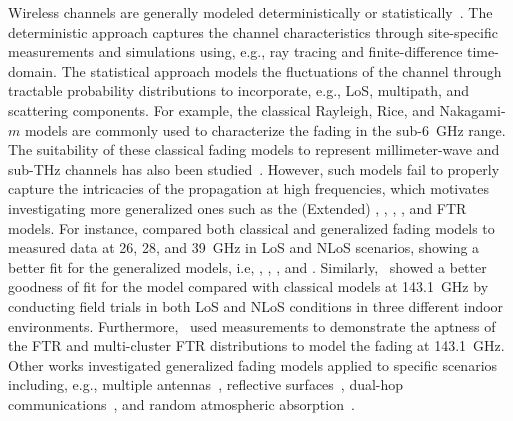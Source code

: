 \documentclass[journal,twocolumn]{IEEEtran}
\begin{document}
Wireless channels are generally modeled deterministically or statistically~\cite{Ser22}. The deterministic approach captures the channel characteristics through site-specific measurements and simulations using, e.g., ray tracing and finite-difference time-domain. The statistical approach models the fluctuations of the channel through tractable probability distributions to incorporate, e.g., \ac{LoS}, multipath, and scattering components. For example, the classical Rayleigh, Rice, and Nakagami-$m$ models are commonly used to characterize the fading in the sub-6~GHz range. The suitability of these classical fading models to represent millimeter-wave and sub-THz channels has also been studied~\cite{Ye22,Iqb19,Ekt17,Liu24}. However, such models fail to properly capture the intricacies of the propagation at high frequencies, which motivates investigating more generalized ones such as the (Extended) \hm{}, \km, \am{}, \ahkm{}, and \ac{FTR} models. For instance, \cite{Mar21} compared both classical and generalized fading models to measured data at 26, 28, and 39~GHz in \ac{LoS} and \ac{NLoS} scenarios, showing a better fit for the generalized models, i.e, \hm{}, \km{}, \am{}, and \ahkm{}. Similarly,~\cite{Pap21} showed a better goodness of fit for the \am{} model compared with classical models at 143.1~GHz by conducting field trials in both \ac{LoS} and \ac{NLoS} conditions in three different indoor environments. Furthermore,~\cite{Du22,San24} used measurements to demonstrate the aptness of the \ac{FTR} and multi-cluster \ac{FTR} distributions to model the fading at 143.1~GHz. Other works investigated generalized fading models applied to specific scenarios including, e.g., multiple antennas~\cite{Jos22}, reflective surfaces~\cite{Du22,Le24,Pre24}, dual-hop communications~\cite{Li22}, and random atmospheric absorption~\cite{Bha24}.
\end{document}
